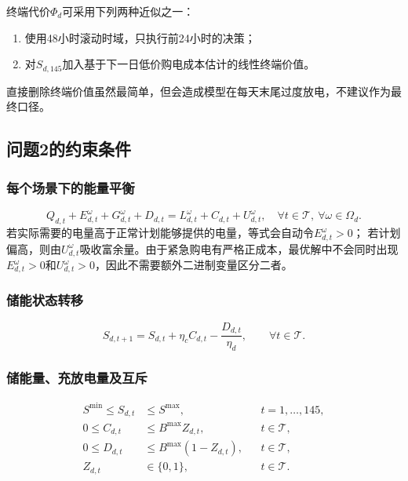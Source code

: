 \documentclass[UTF8,11pt]{ctexart}
\begin{document}
终端代价$\Phi_d$可采用下列两种近似之一：
\begin{enumerate}[label=(\arabic*)]
    \item 使用48小时滚动时域，只执行前24小时的决策；
    \item 对$S_{d,145}$加入基于下一日低价购电成本估计的线性终端价值。
\end{enumerate}
直接删除终端价值虽然最简单，但会造成模型在每天末尾过度放电，不建议作为最终口径。

\subsection{问题2的约束条件}

\subsubsection{每个场景下的能量平衡}

\begin{equation}
    Q_{d,t}+E^{\omega}_{d,t}+G^{\omega}_{d,t}+D_{d,t}
    =L^{\omega}_{d,t}+C_{d,t}+U^{\omega}_{d,t},
    \quad
    \forall t\in\mathcal{T},\ \forall\omega\in\Omega_d.
    \label{eq:q2-balance}
\end{equation}
若实际需要的电量高于正常计划能够提供的电量，等式会自动令$E^{\omega}_{d,t}>0$；
若计划偏高，则由$U^{\omega}_{d,t}$吸收富余量。由于紧急购电有严格正成本，最优解中不会同时出现
$E^{\omega}_{d,t}>0$和$U^{\omega}_{d,t}>0$，因此不需要额外二进制变量区分二者。

\subsubsection{储能状态转移}

\begin{equation}
    S_{d,t+1}=S_{d,t}+\eta_c C_{d,t}-\frac{D_{d,t}}{\eta_d},
    \qquad \forall t\in\mathcal{T}.
    \label{eq:q2-soc}
\end{equation}

\subsubsection{储能量、充放电量及互斥}

\begin{align}
    S^{\min}\leq S_{d,t}&\leq S^{\max},
    &&t=1,\ldots,145, \\
    0\leq C_{d,t}&\leq B^{\max}Z_{d,t},
    &&t\in\mathcal{T}, \\
    0\leq D_{d,t}&\leq B^{\max}(1-Z_{d,t}),
    &&t\in\mathcal{T}, \\
    Z_{d,t}&\in\{0,1\},
    &&t\in\mathcal{T}.
    \label{eq:q2-battery-bound}
\end{align}
\end{document}
